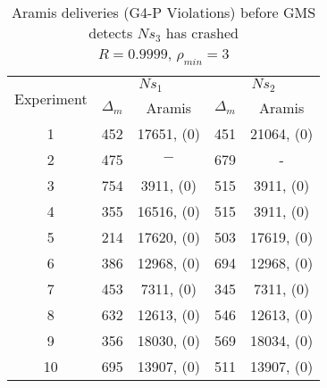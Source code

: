 \begin{table}[p]
    \begin{center}
        \renewcommand{\arraystretch}{1.25}
        \begin{tabular}{|c|c|c|c|c|}
            \hline
            \multirow{2}{*}{Experiment} & \multicolumn{2}{|c|}{$Ns_1$} & \multicolumn{2}{|c|}{$Ns_2$} \\ \cline{2-5}
                                                       & $\Delta_m$&\textsf{Aramis} & $\Delta_m$&\textsf{Aramis} \\ \hline \hline
            1 & 452 & 17651, (0) & 451 & 21064, (0) \\ \hline
            2 & 475 & $-$ & 679 & - \\ \hline
            3 & 754 & 3911, (0) & 515 & 3911, (0)  \\ \hline
            4 & 355 & 16516, (0) & 515 & 3911, (0)  \\ \hline
            5 & 214 & 17620, (0) & 503 & 17619, (0)  \\ \hline
            6 & 386 & 12968, (0) & 694 & 12968, (0)  \\ \hline
            7 & 453 & 7311, (0) & 345 & 7311, (0)  \\ \hline
            8 & 632 & 12613, (0) & 546 & 12613, (0)  \\ \hline
            9 & 356 & 18030, (0) & 569 & 18034, (0)  \\ \hline
            10 & 695 & 13907, (0) & 511 & 13907, (0)  \\ \hline
        \end{tabular}
        \caption{\textsf{Aramis} deliveries (G4-P Violations) before GMS detects $Ns_3$ has crashed \\ $R=0.9999$, $\rho_{min}=3$}
        \label{table:crashed_node_rho3}
    \end{center}
\end{table}

